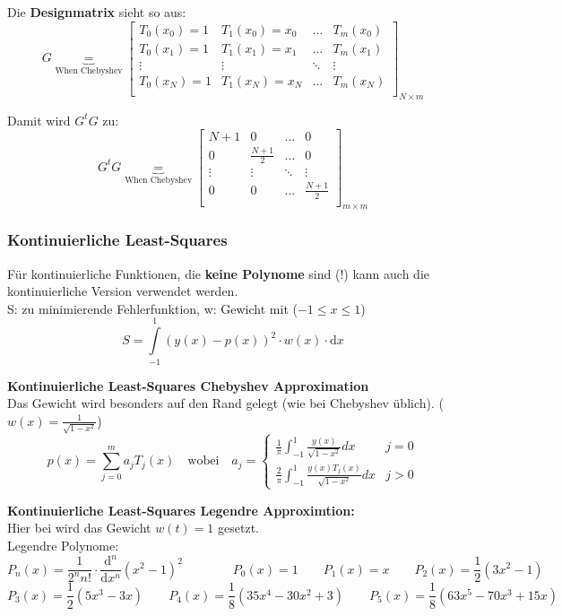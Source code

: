 Die \textbf{Designmatrix} sieht so aus:
$$G \underbrace{=}_{\text{When Chebyshev}} 
\begin{bmatrix}
  T_0(x_0) = 1 & T_1(x_0) = x_0 & \ldots & T_m(x_0) \\
  T_0(x_1) = 1 & T_1(x_1) = x_1 & \ldots & T_m(x_1)\\
  \vdots & \vdots  & \ddots & \vdots\\
  T_0(x_N) = 1 & T_1(x_N) =x_N & \ldots & T_m(x_N)\\
\end{bmatrix}_{N \times m}$$

Damit wird $G^t G$ zu:
$$G^t G \underbrace{=}_{\text{When Chebyshev}} 
\begin{bmatrix}
  N+1 & 0 & \ldots & 0 \\
  0   & \frac{N+1}{2} & \ldots & 0\\
  \vdots  & \vdots & \ddots & \vdots\\
  0   & 0 & \ldots & \frac{N+1}{2}\\
\end{bmatrix}_{m \times m}$$

\subsubsection{Kontinuierliche Least-Squares}
Für kontinuierliche Funktionen, die \textbf{keine Polynome} sind (!) kann auch die kontinuierliche Version
verwendet werden.\\
S: zu minimierende Fehlerfunktion, w: Gewicht mit  ($-1\leq x \leq1$)
\[
	S = \int\limits_{-1}^1 (y(x) - p(x))^2 \cdot w(x) \cdot \mathrm{d}x
\]

\textbf{Kontinuierliche Least-Squares Chebyshev Approximation}\\
 Das Gewicht wird besonders auf den Rand gelegt (wie bei Chebyshev üblich). ($w(x) = \frac{1}{\sqrt{1-x^2}}$)
$$p(x) = \sum_{j=0}^m a_j T_j(x) \quad \text{wobei} \quad
a_j = \begin{cases}
  \frac{1}{\pi} \int_{-1}^1 \frac{y(x)}{\sqrt{1-x^2}} dx & j = 0\\
  \frac{2}{\pi} \int_{-1}^1 \frac{y(x) T_j(x)}{\sqrt{1-x^2}} dx & j > 0 
\end{cases}$$

\textbf{Kontinuierliche Least-Squares Legendre Approximtion:}\\
Hier bei wird das Gewicht $w(t) = 1$ gesetzt.\\

Legendre Polynome:
\[
	P_n(x) = \frac{1}{2^n n!} \cdot \frac{\mathrm{d}^n}{\mathrm{d}x^n}(x^2-1)^2 \qquad \qquad P_0(x) = 1 \qquad P_1(x) = x \qquad P_2(x) = \frac{1}{2}(3x^2-1)
\]
\[
	  P_3(x) = \frac{1}{2}(5x^3 - 3x) \qquad P_4(x) = \frac{1}{8}(35x^4-30x^2+3) \qquad P_5(x) = \frac{1}{8}(63x^5-70x^3+15x)
\]

